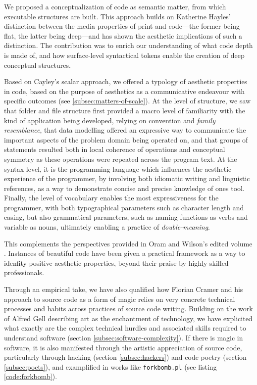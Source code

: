 We proposed a conceptualization of code as semantic matter, from which executable structures are built. This approach builds on Katherine Hayles' distinction between the media properties of print and code—the former being flat, the latter being deep—and has shown the aesthetic implications of such a distinction. The contribution was to enrich our understanding of what code depth is made of, and how surface-level syntactical tokens enable the creation of deep conceptual structures.

Based on Cayley's scalar approach, we offered a typology of aesthetic properties in code, based on the purpose of aesthetics as a communicative endeavour with specific outcomes (see \ref{subsec:matters-of-scale}). At the level of structure, we saw that folder and file structure first provided a macro level of familiarity with the kind of application being developed, relying on convention and \emph{family resemblance}, that data modelling offered an expressive way to communicate the important aspects of the problem domain being operated on, and that groups of statements resulted both in local coherence of operations and conceptual symmetry as these operations were repeated across the program text. At the syntax level, it is the programming language which influences the aesthetic experience of the programmer, by involving both idiomatic writing and linguistic references, as a way to demonstrate concise and precise knowledge of ones tool. Finally, the level of vocabulary enables the most expressiveness for the programmer, with both typographical parameters such as character length and casing, but also grammatical parameters, such as naming functions as verbs and variable as nouns, ultimately enabling a practice of \emph{double-meaning}.

This complements the perspectives provided in Oram and Wilson's edited volume \citep{oram_beautiful_2007}. Instances of beautiful code have been given a practical framework as a way to idenfity positive aesthetic properties, beyond their praise by highly-skilled professionals.

Through an empirical take, we have also qualified how Florian Cramer and his approach to source code as a form of magic relies on very concrete technical processes and habits across practices of source code writing. Building on the work of Alfred Gell describing art as the enchantment of technology, we have explicited what exactly are the complex technical hurdles and associated skills required to understand software (section \ref{subsec:software-complexity}). If there is magic in software, it is also manifested through the artistic appreciation of source code, particularly through hacking (section \ref{subsec:hackers}) and code poetry (section \ref{subsec:poets}), and examplified in works like \lstinline{forkbomb.pl} (see listing \ref{code:forkbomb}).

